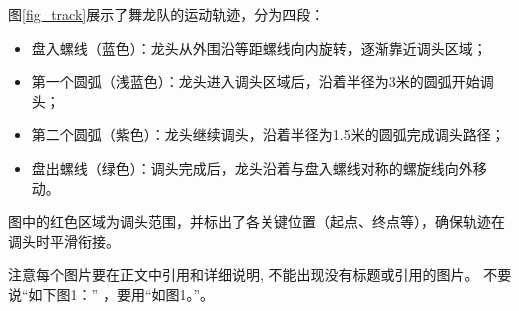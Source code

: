 \documentclass{JYU} %
\begin{document}
图\ref{fig_track}展示了舞龙队的运动轨迹，分为四段：
\begin{itemize}
	\item 盘入螺线（蓝色）：龙头从外围沿等距螺线向内旋转，逐渐靠近调头区域；
	\item 第一个圆弧（浅蓝色）：龙头进入调头区域后，沿着半径为3米的圆弧开始调头；
	\item 第二个圆弧（紫色）：龙头继续调头，沿着半径为1.5米的圆弧完成调头路径；
	\item 盘出螺线（绿色）：调头完成后，龙头沿着与盘入螺线对称的螺旋线向外移动。
\end{itemize}
图中的红色区域为调头范围，并标出了各关键位置（起点、终点等），确保轨迹在调头时平滑衔接。

注意每个图片要在正文中引用和详细说明, 不能出现没有标题或引用的图片。 不要说“如下图1：” ，要用“如图1。”。
\end{document}
